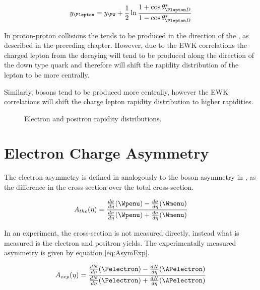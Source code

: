 \begin{equation}
  y_{\Plepton} = 
  y_{\PW} +
  \frac{1}{2}
  \ln
  \frac{1 + \cos \theta_{\Plepton D}^{\ast}}{1 - \cos \theta_{\Plepton D}^{\ast}}
  \label{wbos:leptonfull}
\end{equation}

In proton-proton collisions the \PWp tends to be produced in the direction
of the \Pup, as described in the preceding chapter.  
However, due to the EWK correlations the charged lepton from the decaying \PWp
will tend to be produced along the direction of the down type quark and
therefore will shift the rapidity distribution of the lepton to be more
centrally.\cite{}

Similarly, \PWm bosons tend to be produced more centrally, however the EWK
correlations will shift the charge lepton rapidity distribution to higher rapidities.

\begin{figure}[htb]
  \centering
  \caption{Electron and positron rapidity distributions.}
  \label{wbos:leptonrapidity}
\end{figure}

\section{Electron Charge Asymmetry}

The electron asymmetry is defined in  analogously to the
\PW boson asymmetry in , as the difference in the
\inclusiveWe cross-section over the total \inclusiveWe cross-section.

\begin{equation}
A_{the}(\eta)=\frac{  \frac{d\sigma}{d\eta}(\Wpenu) -
\frac{d\sigma}{d\eta}(\Wmenu) }{ \frac{d\sigma}{d\eta}(\Wpenu) +
\frac{d\sigma}{d\eta}(\Wmenu) }
\label{eq:AsymThe}
\end{equation} 

In an experiment, the cross-section is not measured directly, instead what is
measured is the electron and positron yields.  The experimentally measured
asymmetry is given by equation \ref{eq:AsymExp}.\cite{kom}
 
\begin{equation}
A_{exp}(\eta)=\frac{  \frac{dN}{d\eta}(\Pelectron) -
\frac{dN}{d\eta}(\APelectron) }{ \frac{dN}{d\eta}(\Pelectron) +
\frac{dN}{d\eta}(\APelectron) }
\label{eq:AsymExp}
\end{equation} 


